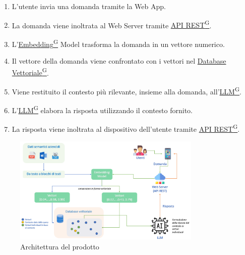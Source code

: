 \begin{enumerate}
    \item L'utente invia una domanda tramite la Web App.
    \item La domanda viene inoltrata al Web Server tramite \href{https://code7crusaders.github.io/docs/PB/documentazione_interna/glossario.html#api-rest-representational-state-transfer}{API REST\textsuperscript{G}}.
    \item L'\href{https://code7crusaders.github.io/docs/PB/documentazione_interna/glossario.html#embedding}{Embedding\textsuperscript{G}} Model trasforma la domanda in un vettore numerico.
    \item Il vettore della domanda viene confrontato con i vettori nel \href{https://code7crusaders.github.io/docs/PB/documentazione_interna/glossario.html#database-vettoriale}{Database Vettoriale\textsuperscript{G}}.
    \item Viene restituito il contesto più rilevante, insieme alla domanda, all'\href{https://code7crusaders.github.io/docs/PB/documentazione_interna/glossario.html#llm-large-language-model}{LLM\textsuperscript{G}}.
    \item L'\href{https://code7crusaders.github.io/docs/PB/documentazione_interna/glossario.html#llm-large-language-model}{LLM\textsuperscript{G}} elabora la risposta utilizzando il contesto fornito.
    \item La risposta viene inoltrata al dispositivo dell'utente tramite \href{https://code7crusaders.github.io/docs/PB/documentazione_interna/glossario.html#api-rest-representational-state-transfer}{API REST\textsuperscript{G}}.
\end{enumerate}

\begin{figure}[h]
    \centering
    \includegraphics[width=0.8\textwidth]{img/architettura.png}
    \caption{Architettura del prodotto}
    \label{fig:architettura}
\end{figure}

